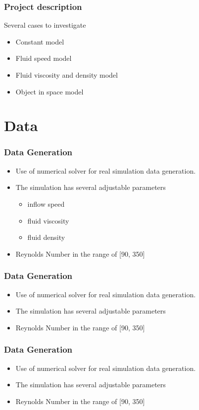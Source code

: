\documentclass[18pt]{beamer}
\begin{document}
\begin{frame}[t]
  \frametitle{Project description}
  \large{Several cases to investigate}
  \begin{itemize}
  \item Constant model
  \item Fluid speed model
  \item Fluid viscosity and density model
  \item Object in space model
  \end{itemize}
  
  
  
\end{frame}

\section{Data}
\begin{frame}[t]
  \frametitle{Data Generation}
  \begin{itemize}
  \item Use of numerical solver for real simulation data generation.
  \item The simulation has several adjustable parameters
    \begin{itemize}
    \item inflow speed
    \item fluid viscosity
    \item fluid density
    \end{itemize}
  \item Reynolds Number in the range of [90, 350]
  \end{itemize}  
\end{frame}

\begin{frame}[t]
  \frametitle{Data Generation}
  \begin{itemize}
  \item Use of numerical solver for real simulation data generation.
  \item The simulation has several adjustable parameters
  \item Reynolds Number in the range of [90, 350]
  \end{itemize}
\end{frame}


\begin{frame}[t]
  \frametitle{Data Generation}
  \begin{itemize}
  \item Use of numerical solver for real simulation data generation.
  \item The simulation has several adjustable parameters
  \item Reynolds Number in the range of [90, 350]
  \end{itemize}
\end{frame}
\end{document}
